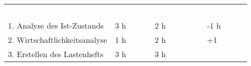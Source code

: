 \begin{tabularx}{\textwidth}{Xlll}
\rowcolor{heading}\textcolor{white}{\textbf{Vorgang}} & \textcolor{white}{\textbf{Geplant}} & \textcolor{white}{\textbf{Tatsächlich}} & \textcolor{white}{\textbf{Differenz}} \\
1. Analyse des Ist-Zustands & 3 h   & 2 h   & -1 h \\
\rowcolor{odd}2. Wirtschaftlichkeitsanalyse & 1 h   & 2 h   &  +1 \\
3. Erstellen des Lastenhefts & 3 h   & 3 h   &  \\
\end{tabularx}
